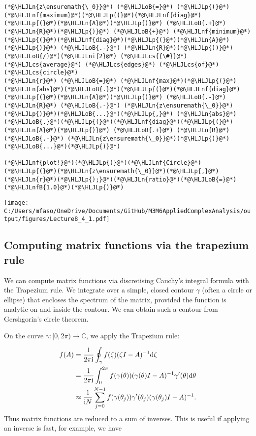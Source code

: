 \documentclass[12pt,landscape]{article}
\newcommand{\HLJLn}[1]{#1}
\newcommand{\HLJLnf}[1]{\textcolor[RGB]{66,102,213}{#1}}
\newcommand{\HLJLnfB}[1]{\textcolor[RGB]{59,151,46}{#1}}
\newcommand{\HLJLni}[1]{\textcolor[RGB]{59,151,46}{#1}}
\newcommand{\HLJLoB}[1]{\textcolor[RGB]{102,102,102}{\textbf{#1}}}
\newcommand{\HLJLp}[1]{#1}
\newcommand{\HLJLcs}[1]{\textcolor[RGB]{153,153,119}{\textit{#1}}}
\def\D{ {\rm d} }
\def\I{ {\rm i} }
\def\cent#1{\begin{center}#1\end{center} }
\begin{document}
{\begin{lstlisting}
(*@\HLJLn{z\ensuremath{\_0}}@*) (*@\HLJLoB{=}@*) (*@\HLJLp{(}@*)(*@\HLJLnf{maximum}@*)(*@\HLJLp{(}@*)(*@\HLJLnf{diag}@*)(*@\HLJLp{(}@*)(*@\HLJLn{A}@*)(*@\HLJLp{)}@*) (*@\HLJLoB{.+}@*) (*@\HLJLn{R}@*)(*@\HLJLp{)}@*) (*@\HLJLoB{+}@*) (*@\HLJLnf{minimum}@*)(*@\HLJLp{(}@*)(*@\HLJLnf{diag}@*)(*@\HLJLp{(}@*)(*@\HLJLn{A}@*)(*@\HLJLp{)}@*) (*@\HLJLoB{.-}@*) (*@\HLJLn{R}@*)(*@\HLJLp{))}@*) (*@\HLJLoB{/}@*)(*@\HLJLni{2}@*) (*@\HLJLcs{{\#}}@*) (*@\HLJLcs{average}@*) (*@\HLJLcs{edges}@*) (*@\HLJLcs{of}@*) (*@\HLJLcs{circle}@*)
(*@\HLJLn{r}@*) (*@\HLJLoB{=}@*) (*@\HLJLnf{max}@*)(*@\HLJLp{(}@*)(*@\HLJLn{abs}@*)(*@\HLJLoB{.}@*)(*@\HLJLp{(}@*)(*@\HLJLnf{diag}@*)(*@\HLJLp{(}@*)(*@\HLJLn{A}@*)(*@\HLJLp{)}@*) (*@\HLJLoB{.-}@*) (*@\HLJLn{R}@*) (*@\HLJLoB{.-}@*) (*@\HLJLn{z\ensuremath{\_0}}@*)(*@\HLJLp{)}@*)(*@\HLJLoB{...}@*)(*@\HLJLp{,}@*) (*@\HLJLn{abs}@*)(*@\HLJLoB{.}@*)(*@\HLJLp{(}@*)(*@\HLJLnf{diag}@*)(*@\HLJLp{(}@*)(*@\HLJLn{A}@*)(*@\HLJLp{)}@*) (*@\HLJLoB{.+}@*) (*@\HLJLn{R}@*) (*@\HLJLoB{.-}@*) (*@\HLJLn{z\ensuremath{\_0}}@*)(*@\HLJLp{)}@*)(*@\HLJLoB{...}@*)(*@\HLJLp{)}@*)

(*@\HLJLnf{plot!}@*)(*@\HLJLp{(}@*)(*@\HLJLnf{Circle}@*)(*@\HLJLp{(}@*)(*@\HLJLn{z\ensuremath{\_0}}@*)(*@\HLJLp{,}@*) (*@\HLJLn{r}@*)(*@\HLJLp{);}@*)(*@\HLJLn{ratio}@*)(*@\HLJLoB{=}@*)(*@\HLJLnfB{1.0}@*)(*@\HLJLp{)}@*)
\end{lstlisting}

\cent{\texttt{[image: C:/Users/mfaso/OneDrive/Documents/GitHub/M3M6AppliedComplexAnalysis/output/figures/Lecture8\_4\_1.pdf]}}


\subsection{Computing matrix functions via the trapezium rule}
We can compute matrix functions via discretising Cauchy's integral formula with the Trapezium rule. We integrate over a simple, closed contour $\gamma$ (often a circle or ellipse) that encloses the spectrum of the matrix, provided the function is analytic on and inside the contour. We can obtain such a contour from Gershgorin's circle theorem.

On the curve $\gamma : [0,2 \pi) \rightarrow \mathbb{C}$, we apply the Trapezium rule:


\begin{align*}
f(A) & = {1 \over 2 \pi \I} \oint_\gamma f(\zeta) (\zeta I - A)^{-1} \D \zeta \\
& = {1 \over 2 \pi \I} \int_0^{2\pi}  f(\gamma(\theta)) (\gamma(\theta) I - A)^{-1}\gamma'(\theta)  \D \theta \\
& \approx
{1 \over \I N}  \sum_{j=0}^{N-1} f(\gamma(\theta_j)) \gamma'(\theta_j) (\gamma(\theta_j) I - A)^{-1}.
\end{align*}
Thus matrix functions are reduced to a sum of inverses. This is useful if applying an inverse is fast, for example, we have

}
\end{document}
